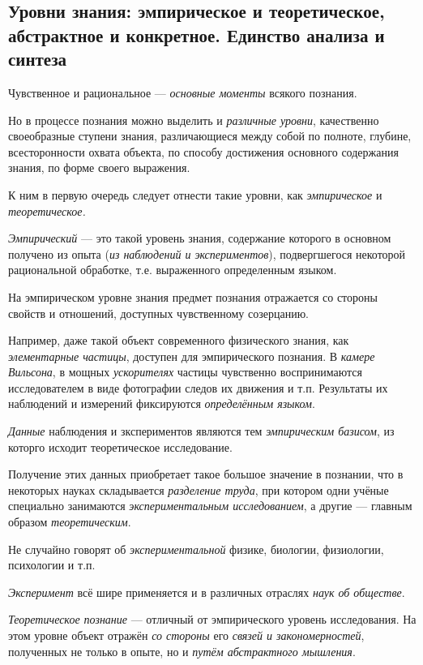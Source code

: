 \documentclass[a4paper,14pt,russian]{extreport}
\begin{document}
\subsection{Уровни знания: эмпирическое и теоретическое, абстрактное и конкретное. Единство анализа и синтеза}

Чувственное и рациональное --- \emph{основные моменты} всякого познания.

Но в процессе познания можно выделить и \emph{различные уровни}, качественно своеобразные ступени знания, различающиеся между собой по полноте, глубине, всесторонности охвата объекта, по способу достижения основного содержания знания, по форме своего выражения.

К ним в первую очередь следует отнести такие уровни, как \emph{эмпирическое} и \emph{теоретическое.}

\emph{Эмпирический} --- это такой уровень знания, содержание которого в основном получено из опыта (\emph{из наблюдений и экспериментов}), подвергшегося некоторой рациональной обработке, т.е. выраженного определенным языком.

На эмпирическом уровне знания предмет познания отражается со стороны свойств и отношений, доступных чувственному созерцанию.

Например, даже такой объект современного физического знания, как \emph{элементарные частицы}, доступен для эмпирического познания. В \emph{камере Вильсона}, в мощных \emph{ускорителях} частицы чувственно воспринимаются исследователем в виде фотографии следов их движения и т.п. Результаты их наблюдений и измерений фиксируются \emph{определённым языком}.

\emph{Данные} наблюдения и зкспериментов являются тем \emph{эмпирическим базисом}, из которго исходит теоретическое исследование.

Получение этих данных приобретает такое большое значение в познании, что в некоторых науках складывается \emph{разделение труда}, при котором одни учёные специально занимаются \emph{экспериментальным исследованием}, а другие --- главным образом \emph{теоретическим}.

Не случайно говорят об \emph{экспериментальной} физике, биологии, физиологии, психологии и т.п.

\emph{Эксперимент} всё шире применяется и в различных отраслях \emph{наук об обществе}.

\emph{Теоретическое познание} --- отличный от эмпирического уровень исследования. На этом уровне объект отражён \emph{со стороны} его \emph{связей и закономерностей}, полученных не только в опыте, но и \emph{путём абстрактного мышления}.
\end{document}
